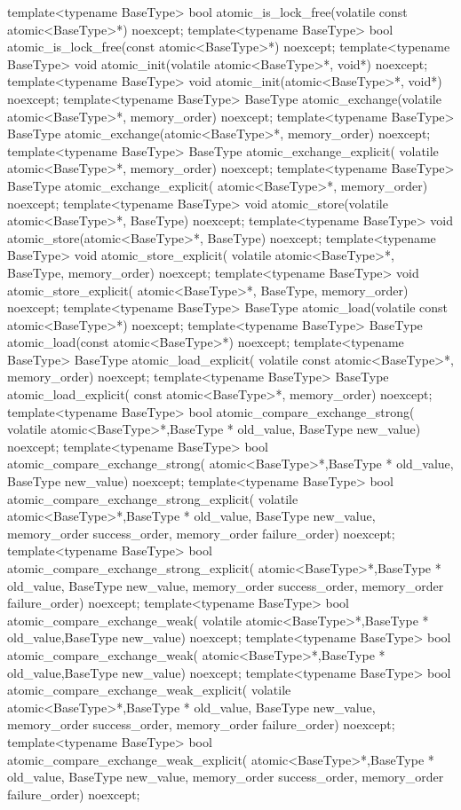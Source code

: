 \begin{cpp}
template<typename BaseType>
bool atomic_is_lock_free(volatile const atomic<BaseType>*) noexcept;
template<typename BaseType>
bool atomic_is_lock_free(const atomic<BaseType>*) noexcept;
template<typename BaseType>
void atomic_init(volatile atomic<BaseType>*, void*) noexcept;
template<typename BaseType>
void atomic_init(atomic<BaseType>*, void*) noexcept;
template<typename BaseType>
BaseType atomic_exchange(volatile atomic<BaseType>*, memory_order)
  noexcept;
template<typename BaseType>
BaseType atomic_exchange(atomic<BaseType>*, memory_order) noexcept;
template<typename BaseType>
BaseType atomic_exchange_explicit(
  volatile atomic<BaseType>*, memory_order) noexcept;
template<typename BaseType>
BaseType atomic_exchange_explicit(
  atomic<BaseType>*, memory_order) noexcept;
template<typename BaseType>
void atomic_store(volatile atomic<BaseType>*, BaseType) noexcept;
template<typename BaseType>
void atomic_store(atomic<BaseType>*, BaseType) noexcept;
template<typename BaseType>
void atomic_store_explicit(
  volatile atomic<BaseType>*, BaseType, memory_order) noexcept;
template<typename BaseType>
void atomic_store_explicit(
  atomic<BaseType>*, BaseType, memory_order) noexcept;
template<typename BaseType>
BaseType atomic_load(volatile const atomic<BaseType>*) noexcept;
template<typename BaseType>
BaseType atomic_load(const atomic<BaseType>*) noexcept;
template<typename BaseType>
BaseType atomic_load_explicit(
  volatile const atomic<BaseType>*, memory_order) noexcept;
template<typename BaseType>
BaseType atomic_load_explicit(
  const atomic<BaseType>*, memory_order) noexcept;
template<typename BaseType>
bool atomic_compare_exchange_strong(
  volatile atomic<BaseType>*,BaseType * old_value,
  BaseType new_value) noexcept;
template<typename BaseType>
bool atomic_compare_exchange_strong(
  atomic<BaseType>*,BaseType * old_value,
  BaseType new_value) noexcept;
template<typename BaseType>
bool atomic_compare_exchange_strong_explicit(
  volatile atomic<BaseType>*,BaseType * old_value,
  BaseType new_value, memory_order success_order,
  memory_order failure_order) noexcept;
template<typename BaseType>
bool atomic_compare_exchange_strong_explicit(
  atomic<BaseType>*,BaseType * old_value,
  BaseType new_value, memory_order success_order,
  memory_order failure_order) noexcept;
template<typename BaseType>
bool atomic_compare_exchange_weak(
  volatile atomic<BaseType>*,BaseType * old_value,BaseType new_value)
  noexcept;
template<typename BaseType>
bool atomic_compare_exchange_weak(
  atomic<BaseType>*,BaseType * old_value,BaseType new_value) noexcept;
template<typename BaseType>
bool atomic_compare_exchange_weak_explicit(
  volatile atomic<BaseType>*,BaseType * old_value,
  BaseType new_value, memory_order success_order,
  memory_order failure_order) noexcept;
template<typename BaseType>
bool atomic_compare_exchange_weak_explicit(
  atomic<BaseType>*,BaseType * old_value,
  BaseType new_value, memory_order success_order,
  memory_order failure_order) noexcept;
\end{cpp}

